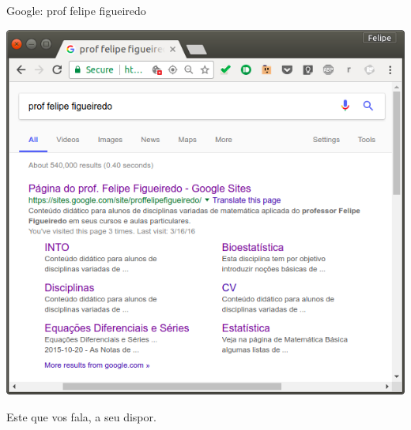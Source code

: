 \documentclass{beamer}
\begin{document}
\begin{frame}{Google: prof felipe figueiredo}
  \begin{center}
    \includegraphics[height=.7\textheight]{Intro/felipefigueiredo}
    \begin{exampleblock}{}
      \begin{center}
        Este que vos fala, a seu dispor.
      \end{center}
    \end{exampleblock}
  \end{center}
\end{frame}
\end{document}
